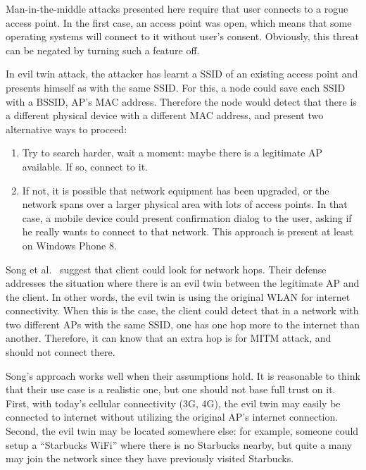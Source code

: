 \documentclass[12pt,a4paper,oneside,pdftex]{report}
\begin{document}
Man-in-the-middle attacks presented here require that user connects to a rogue access point. In the first case, an access point was open, which means that some operating systems will connect to it without user's consent. Obviously, this threat can be negated by turning such a feature off. 

In evil twin attack, the attacker has learnt a SSID of an existing access point and presents himself as with the same SSID. For this, a node could save each SSID with a BSSID, AP's MAC address. Therefore the node would detect that there is a different physical device with a different MAC address, and present two alternative ways to proceed:
\begin{enumerate}
    \item Try to search harder, wait a moment: maybe there is a legitimate AP available. If so, connect to it.
    \item If not, it is possible that network equipment has been upgraded, or the network spans over a larger physical area with lots of access points. In that case, a mobile device could present confirmation dialog to the user, asking if he really wants to connect to that network. This approach is present at least on Windows Phone 8.
\end{enumerate}

Song et al.~\cite{song2010peeping} suggest that client could look for network hops. Their defense addresses the situation where there is an evil twin between the legitimate AP and the client. In other words, the evil twin is using the original WLAN for internet connectivity. When this is the case, the client could detect that in a network with two different APs with the same SSID, one has one hop more to the internet than another. Therefore, it can know that an extra hop is for MITM attack, and should not connect there.

Song's approach works well when their assumptions hold. It is reasonable to think that their use case is a realistic one, but one should not base full trust on it. First, with today's cellular connectivity (3G, 4G), the evil twin may easily be connected to internet without utilizing the original AP's internet connection. Second, the evil twin may be located somewhere else: for example, someone could setup a ``Starbucks WiFi'' where there is no Starbucks nearby, but quite a many may join the network since they have previously visited Starbucks.
\end{document}
